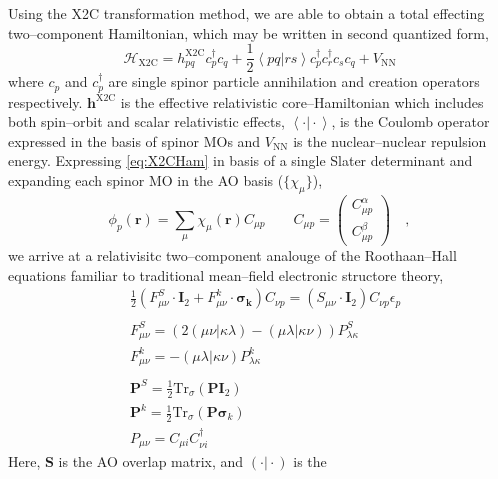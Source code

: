 \documentclass[12pt]{article}
\newcommand{\inner}[2]{\left\langle #1 \left\vert\right. #2 \right\rangle}            %
\newcommand*\vc[1]{\boldsymbol{#1}}
\newcommand*\op[1]{\mathcal{#1}}
\begin{document}
Using the X2C transformation method, we are able to obtain a total effecting
two--component Hamiltonian, which may be written in second quantized form,
\begin{equation}
\op{H}_\mathrm{X2C} = h_{pq}^\mathrm{X2C}c_p^\dagger c_q + 
  \frac{1}{2} \inner{pq}{rs} c_p^\dagger c_r^\dagger c_s c_q + V_\mathrm{NN}
  \label{eq:X2CHam}
\end{equation}
where $c_p$ and $c_p^\dagger$ are single spinor particle annihilation and
creation operators respectively. $\vc{h}^\mathrm{X2C}$ is the effective
relativistic core--Hamiltonian which includes both spin--orbit and scalar
relativistic effects, $\inner{\cdot}{\cdot}$, is the Coulomb operator expressed
in the basis of spinor MOs and $V_\mathrm{NN}$ is the nuclear--nuclear repulsion
energy. Expressing \cref{eq:X2CHam} in basis of a single Slater determinant and
expanding each spinor MO in the AO basis ($\lbrace \chi_\mu \rbrace$),
\begin{equation}
\phi_p ( \vc{r} ) = \sum_\mu \chi_\mu(\vc{r}) C_{\mu p}
\qquad
C_{\mu p} = \begin{pmatrix}
C_{\mu p}^\alpha \\ C_{\mu p}^\beta
\end{pmatrix}
\quad , \label{eq:AO2MO}
\end{equation}
we arrive at a relativisitc two--component analouge of the Roothaan--Hall
equations familiar to traditional mean--field electronic structore theory,
\begin{align}
&\frac{1}{2}\left(
  F^S_{\mu\nu} \cdot \vc{I}_2 + F^k_{\mu\nu} \cdot \vc{\sigma_k}
\right) C_{\nu p} = (S_{\mu\nu}\cdot \vc{I}_2) C_{\nu p}
\epsilon_p\label{eq:Roothaan}\\
\nonumber \\
&F^S_{\mu\nu} = \left(
  2\left( \mu\nu \vert \kappa\lambda \right) - 
  \left(  \mu\lambda \vert \kappa\nu \right) 
\right) P^S_{\lambda \kappa} \nonumber \\
&F^k_{\mu\nu} = -\left(  \mu\lambda \vert \kappa\nu \right) P^k_{\lambda \kappa}\\
\nonumber \\
&\vc{P}^S = \frac{1}{2}\mathrm{Tr}_\sigma (\vc{P}\vc{I}_2) \nonumber \\
&\vc{P}^k = \frac{1}{2}\mathrm{Tr}_\sigma (\vc{P}\vc{\sigma}_k)
\label{eq:traceRel}\\
&P_{\mu\nu} = C_{\mu i} C_{\nu i}^\dagger \nonumber
\end{align}
Here, $\vc{S}$ is the AO overlap matrix, and $(\cdot \vert \cdot)$ is the
\end{document}
